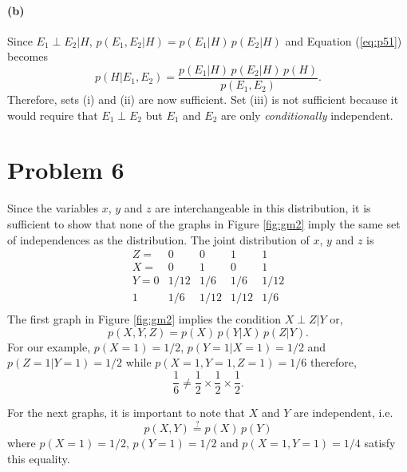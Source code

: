 \documentclass[11pt]{article}
\newcommand{\eq}[1]{Equation (\ref{eq:#1})}
\newcommand{\fig}[1]{Figure \ref{fig:#1}}
\newcommand{\pr}[1]{\ensuremath{p(#1)}}
\begin{document}
\paragraph{(b)}

Since $E_1 \perp E_2 | H$, $\pr{E_1, E_2|H} = \pr{E_1|H}\,\pr{E_2|H}$ and
\eq{p51} becomes
\begin{equation}
    \pr{H | E_1,E_2} = \frac{\pr{E_1|H}\, \pr{E_2|H} \, \pr{H}}{\pr{E_1,E_2}}.
\end{equation}
Therefore, sets (i) and (ii) are now sufficient. Set (iii) is not sufficient
because it would require that $E_1 \perp E_2$ but $E_1$ and $E_2$ are only
\emph{conditionally} independent.

\section{Problem 6}

Since the variables $x$, $y$ and $z$ are interchangeable in this
distribution, it is sufficient to show that none of the graphs in
\fig{gm2} imply the same set of independences as the distribution.
The joint distribution of $x$, $y$ and $z$ is
\begin{equation}
    \begin{array}{r|cccc}
        Z = & 0 & 0 & 1 & 1 \\
        X = & 0 & 1 & 0 & 1 \\\hline
        Y = 0 & 1/12 & 1/6 & 1/6 & 1/12 \\
            1 & 1/6 & 1/12 & 1/12 & 1/6 \\
    \end{array}
\end{equation}
The first graph in \fig{gm2} implies the condition $X \perp Z | Y$ or,
\begin{equation}
    p(X,Y,Z) = p(X) \, p(Y | X) \, p (Z | Y).
\end{equation}
For our example, $p(X=1) = 1/2$, $p(Y = 1 | X =1) = 1/2$ and
$p(Z = 1 | Y = 1) = 1/2$ while $p(X=1, Y=1, Z=1) = 1/6$ therefore,
\begin{equation}
    \frac{1}{6} \ne \frac{1}{2} \times \frac{1}{2} \times \frac{1}{2}.
\end{equation}

For the next graphs, it is important to note that $X$ and $Y$ are
independent, i.e.
\begin{equation}
    \pr{X, Y} \stackrel{?}{=} \pr{X} \, \pr{Y}
\end{equation}
where $\pr{X = 1} = 1/2$, $\pr{Y = 1} = 1/2$ and
$\pr{X=1,Y=1} = 1/4$ satisfy this equality.
\end{document}

